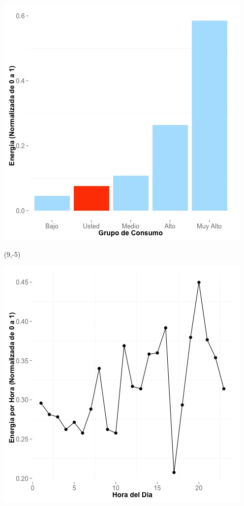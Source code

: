 \documentclass{article}\usepackage[]{graphicx}\usepackage[]{color}
\newenvironment{knitrout}{}{} %
\begin{document}
\begin{knitrout}
\color{fgcolor}
\includegraphics[scale=0.65]{figure/A5_neighbor_plot} 
\end{knitrout}

 \begin{textblock}{1}(9,-5)
\begin{minipage}{20em}
\begingroup

\endgroup
\end{minipage}
\end{textblock}


\begin{knitrout}
\color{fgcolor}
\includegraphics[scale=0.65]{figure/A5_plot_norm_median} 
\end{knitrout}
\end{document}
